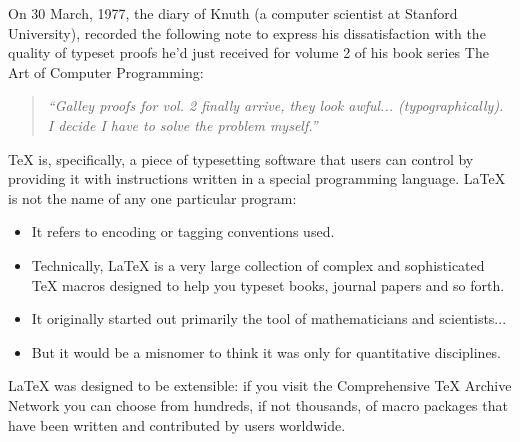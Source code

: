 \documentclass[a4paper, 12pt]{article}
\begin{document}
\noindent 									%
On 30 March, 1977, the diary of Knuth (a computer scientist at Stanford University), recorded the following note to express his dissatisfaction with the quality of typeset proofs he’d just received for volume 2 of his book series The Art of Computer Programming:

\begin{quote} 								%
\begin{center}								%
\textit{``Galley proofs for vol. 2 finally arrive, they look awful... (typographically). I decide I have to solve the problem myself.''}
\end{center}									%
\end{quote}									%

\noindent
\TeX{} is, specifically, a piece of typesetting software that users can control by providing it with instructions written in a special programming language. \LaTeX{} is not the name of any one particular program:

\begin{itemize}
\item It refers to encoding or tagging conventions used.
\item Technically, \LaTeX{} is a very large collection of complex and sophisticated \TeX{} macros designed to help you typeset books, journal papers and so forth.
\item It originally started out primarily the tool of mathematicians and scientists...
\item But it would be a misnomer to think it was only for quantitative disciplines.
\end{itemize}

\noindent
\LaTeX{} was designed to be extensible: if you visit the Comprehensive TeX Archive Network you can choose from hundreds, if not thousands, of macro packages that have been written and contributed by users worldwide.
 
\end{document}
